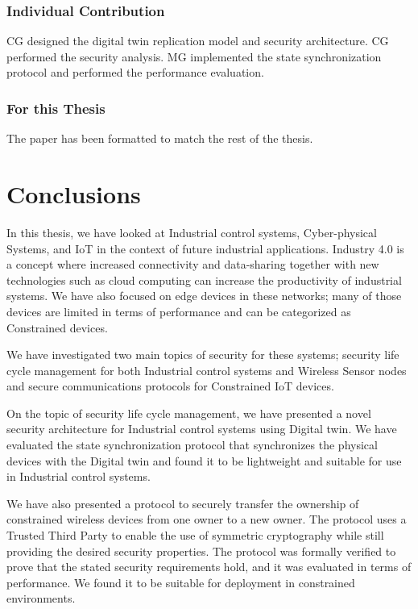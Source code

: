 \subsubsection{Individual Contribution}
CG designed the digital twin replication model and security architecture. CG performed the security analysis. MG implemented the state synchronization protocol and performed the performance evaluation.
\subsubsection{For this Thesis}
The paper has been formatted to match the rest of the thesis.

\newpage

\section{Conclusions}
In this thesis, we have looked at Industrial control systems, Cyber-physical Systems, and IoT in the context of future industrial applications. Industry 4.0 is a concept where increased connectivity and data-sharing together with new technologies such as cloud computing can increase the productivity of industrial systems. We have also focused on edge devices in these networks; many of those devices are limited in terms of performance and can be categorized as Constrained devices.

We have investigated two main topics of security for these systems; security life cycle management for both Industrial control systems and Wireless Sensor nodes and secure communications protocols for Constrained IoT devices. 

On the topic of security life cycle management, we have presented a novel security architecture for Industrial control systems using Digital twin. We have evaluated the state synchronization protocol that synchronizes the physical devices with the Digital twin and found it to be lightweight and suitable for use in Industrial control systems.

We have also presented a protocol to securely transfer the ownership of constrained wireless devices from one owner to a new owner. The protocol uses a Trusted Third Party to enable the use of symmetric cryptography while still providing the desired security properties. The protocol was formally verified to prove that the stated security requirements hold, and it was evaluated in terms of performance. We found it to be suitable for deployment in constrained environments.

